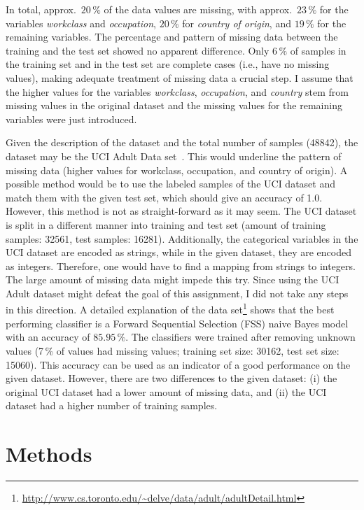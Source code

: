 \documentclass[a4paper,11pt]{article}
\begin{document}
In total, approx.\ $20\,\%$ of the data values are missing, with
approx.\ $23\,\%$ for the variables \emph{workclass} and
\emph{occupation}, $20\,\%$ for \emph{country of origin}, and $19\,\%$
for the remaining variables. The percentage and pattern of missing
data between the training and the test set showed no apparent
difference. Only $6\,\%$ of samples in the training set and in the
test set are complete cases (i.e., have no missing values), making
adequate treatment of missing data a crucial step. I assume that the
higher values for the variables \emph{workclass}, \emph{occupation},
and \emph{country} stem from missing values in the original dataset
and the missing values for the remaining variables were just
introduced.

Given the description of the dataset and the total number of samples
(48842), the dataset may be the UCI Adult Data
set~\cite{lichman2013}. This would underline the pattern of missing
data (higher values for workclass, occupation, and country of
origin). A possible method would be to use the labeled samples of the
UCI dataset and match them with the given test set, which should give
an accuracy of 1.0. However, this method is not as straight-forward as
it may seem. The UCI dataset is split in a different manner into
training and test set (amount of training samples: 32561, test
samples: 16281). Additionally, the categorical variables in the UCI
dataset are encoded as strings, while in the given dataset, they are
encoded as integers. Therefore, one would have to find a mapping from
strings to integers. The large amount of missing data might impede
this try. Since using the UCI Adult dataset might defeat the goal of
this assignment, I did not take any steps in this direction. A
detailed explanation of the data set\footnote{\url{http://www.cs.toronto.edu/~delve/data/adult/adultDetail.html}}
shows that the best performing classifier is a Forward Sequential
Selection (FSS) naive Bayes model with an accuracy of $85.95\,\%$. The
classifiers were trained after removing unknown values (7\,\% of
values had missing values; training set size: 30162, test set size:
15060). This accuracy can be used as an indicator of a good
performance on the given dataset. However, there are two differences
to the given dataset: (i) the original UCI dataset had a lower amount
of missing data, and (ii) the UCI dataset had a higher number of
training samples.

\section{Methods}
\label{sec:methods}
\end{document}
